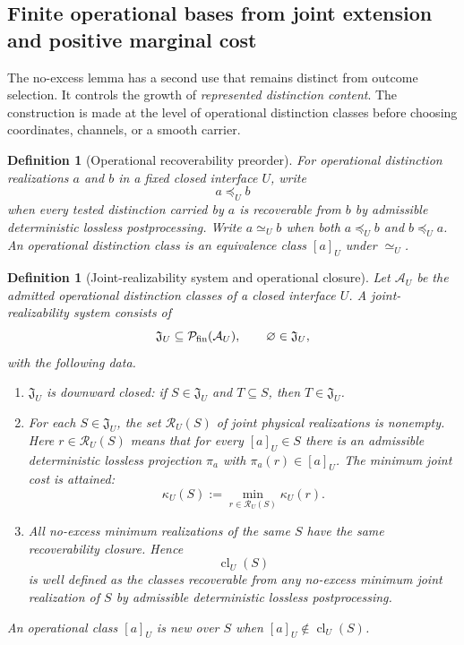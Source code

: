 \documentclass[11pt]{article}
\newtheorem{definition}[theorem]{Definition}
\theoremstyle{remark}
\newcommand{\Cost}{\kappa}
\begin{document}
\subsection{Finite operational bases from joint extension and positive marginal cost}\label{sec:finite-operational-basis}

The no-excess lemma has a second use that remains distinct from outcome selection.  It controls the growth of \emph{represented distinction content}.  The construction is made at the level of operational distinction classes before choosing coordinates, channels, or a smooth carrier.

\begin{definition}[Operational recoverability preorder]\label{def:recoverability-preorder}
For operational distinction realizations $a$ and $b$ in a fixed closed interface $U$, write
\[
        a\preceq_U b
\]
when every tested distinction carried by $a$ is recoverable from $b$ by admissible deterministic lossless postprocessing.  Write $a\simeq_U b$ when both $a\preceq_U b$ and $b\preceq_U a$.  An \emph{operational distinction class} is an equivalence class $[a]_U$ under $\simeq_U$.
\end{definition}

\begin{definition}[Joint-realizability system and operational closure]
\label{def:joint-realizability-system}\label{def:operational-closure}
Let $\mathcal A_U$ be the admitted operational distinction classes of a closed
interface $U$.  A \emph{joint-realizability system} consists of
\[
  \mathfrak J_U\subseteq\mathcal P_{\rm fin}(\mathcal A_U),
  \qquad \varnothing\in\mathfrak J_U,
\]
with the following data.
\begin{enumerate}[label=(\roman*)]
\item $\mathfrak J_U$ is downward closed: if $S\in\mathfrak J_U$ and
$T\subseteq S$, then $T\in\mathfrak J_U$.
\item For each $S\in\mathfrak J_U$, the set $\mathcal R_U(S)$ of joint
physical realizations is nonempty.  Here $r\in\mathcal R_U(S)$ means that for
every $[a]_U\in S$ there is an admissible deterministic lossless projection
$\pi_a$ with $\pi_a(r)\in[a]_U$.  The minimum joint cost is attained:
\[
  \kappa_U(S)
  :=\min_{r\in\mathcal R_U(S)}\Cost_U(r).
\]
\item All no-excess minimum realizations of the same $S$ have the same
recoverability closure.  Hence
\[
  \operatorname{cl}_U(S)
\]
is well defined as the classes recoverable from any no-excess minimum joint
realization of $S$ by admissible deterministic lossless postprocessing.
\end{enumerate}
An operational class $[a]_U$ is \emph{new over $S$} when
$[a]_U\notin\operatorname{cl}_U(S)$.
\end{definition}
\end{document}
